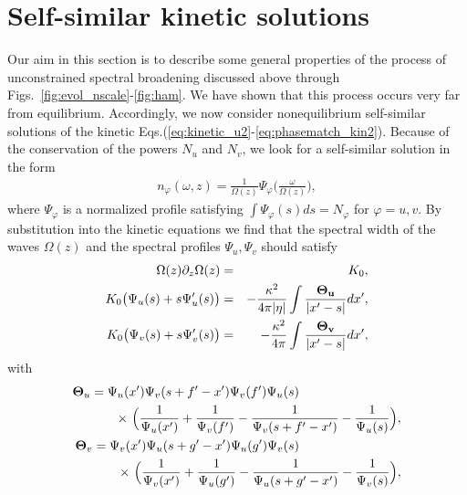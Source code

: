 \documentclass[pra,twocolumn,showpacs,preprintnumbers,amsmath,amssymb]{revtex4}
\begin{document}
\section{Self-similar kinetic solutions}

Our aim in this section is to describe some general properties of the process of unconstrained spectral broadening discussed above through Figs.~\ref{fig:evol_nscale}-\ref{fig:ham}.
We have shown that this process occurs very far from equilibrium.
Accordingly, we now consider nonequilibrium self-similar solutions of the kinetic Eqs.(\ref{eq:kinetic_u2}-\ref{eq:phasematch_kin2}).
Because of the conservation of the powers $N_u$ and $N_v$, we look for a self-similar solution in the form
\begin{eqnarray}
n_\varphi(\omega,z) = \frac{1}{\Omega(z)} \Psi_\varphi\Big(\frac{\omega}{\Omega(z)}\Big),
\end{eqnarray}
where $ \Psi_\varphi$ is a normalized profile satisfying $\int \Psi_\varphi(s) ds =N_\varphi$ for $\varphi=u,v$.
By substitution into the kinetic equations we find that the spectral width of the waves $\Omega(z)$ and the spectral profiles $\Psi_u,\Psi_v$ should satisfy
\begin{eqnarray}
\Omega(z) \partial_z \Omega(z) &=& K_0 , 
\label{eq:Omega} \\
K_0 \big( \Psi_u(s) + s\Psi_u'(s) \big) &=& - \frac{\kappa^2}{4\pi |\eta|} \int 
\frac{\bf \Theta_u}{|x' - s|} dx',
\label{eq:Psi_u} \\
K_0\big( \Psi_v(s) + s\Psi_v'(s) \big) &=& -\frac{\kappa^2}{4\pi} \int 
\frac{\bf \Theta_v}{|x' - s|} dx',
\label{eq:Psi_v} 
\end{eqnarray}
with 
\begin{eqnarray}
{\bf \Theta}_u =  \Psi_u(x') \Psi_v(s+f'-x') \Psi_v(f') \Psi_u(s) 
\quad \quad  \quad \quad  \quad \quad  \quad \quad   \nonumber \\
\quad \quad \quad   \times \ \Big( \frac{1}{\Psi_u(x') }+\frac{1}{\Psi_v(f')}-\frac{1}{\Psi_v(s+f'-x')}-\frac{1}{\Psi_u(s)} \Big), \nonumber \\
{\bf \Theta}_v = \Psi_v(x') \Psi_u(s+g'-x') \Psi_u(g') \Psi_v(s) 
\quad \quad  \quad \quad  \quad \quad  \quad \quad   \nonumber \\
\quad \quad \quad  \times \ \Big( \frac{1}{\Psi_v(x') }+\frac{1}{\Psi_u(g')}-\frac{1}{\Psi_u(s+g'-x')}-\frac{1}{\Psi_v(s)} \Big), \nonumber
\end{eqnarray}
\end{document}

